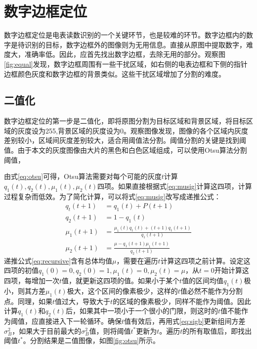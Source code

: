 \section{数字边框定位}

数字边框定位是电表读数识别的一个关键环节，也是较难的环节。数字边框内的数字是待识别的目标，数字边框外的图像则为无用信息。直接从原图中提取数字，难度大，准确率低。因此，应首先找出数字边框，去除无用的部分。观察图\ref{fig:equal}发现，数字边框周围有一些干扰区域，如右侧的电表边框和下侧的指针边框颜色灰度和数字边框的背景类似。这些干扰区域增加了分割的难度。

\subsection{二值化}

数字边框定位的第一步是二值化，即将原图分割为目标区域和背景区域，将目标区域的灰度设为255,背景区域的灰度设为0。观察图像发现，图像的各个区域内灰度差别较小，区域间灰度差别较大，适合用阈值法分割。阈值分割的关键是找到阈值。由于本文的灰度图像由大片的黑色和白色区域组成，可以使用Otsu算法分割阈值，

由式\eqref{eq:otsu}可得，Otsu算法需要对每个可能的灰度$t$计算$q_1(t),q_2(t),\mu_1(t),\mu_2(t)$四项。如果直接根据式\eqref{eq:musig}计算这四项，计算过程复杂而低效。为了简化计算，可以将式\eqref{eq:musig}改写成递推公式：
\begin{equation}
  \label{eq:recursive}
  \begin{aligned}
    q_t(t+1) &=q_1(t)+P(t+1)\\
    q_2(t+1) &=1-q_1(t) \\
    \mu_1(t+1) &=\frac{\mu_1(t)q_1(t)+(t+1)q_1(t+1)}{q_1(t+1)} \\
    \mu_2(t+1) &=\frac{\mu-q_1(t+1)\mu_1(t+1)}{q_2(t+1)}
  \end{aligned}
\end{equation}
递推公式\eqref{eq:recursive}含有总体均值$\mu$，需要在遍历$t$计算这四项之前计算。设定这四项的初值$q_1(0)=0,q_2(0)=1,\mu_1(t)=0,\mu_2(t)=\mu$，从$t=0$开始计算这四项，每增加一次$t$值，就更新这四项的值。如果小于某个$t$值的区间均值$q_1(t)$极小，则其方差$\mu_1(t)$极大，这个区间的像素极少，这样的$t$值必然不能作为分割点。同理，如果$t$值过大，导致大于$t$的区域的像素极少，同样不能作为阈值。因此计算$q_1(t)$和$q_2(t)$后，如果其中一项小于一个很小的门限，则这时的$t$值不能作为阈值，应直接进入下一轮循环。确保$t$值有效后，再用式\eqref{eq:sigb}更新组间方差$\sigma_B^2$，如果大于目前最大的$\sigma_B^2$值，则将阈值$t^{*}$更新为$t$。遍历$t$的所有取值后，即找出阈值$t^{*}$。分割结果是二值图像，如图\ref{fig:otsu}所示。


